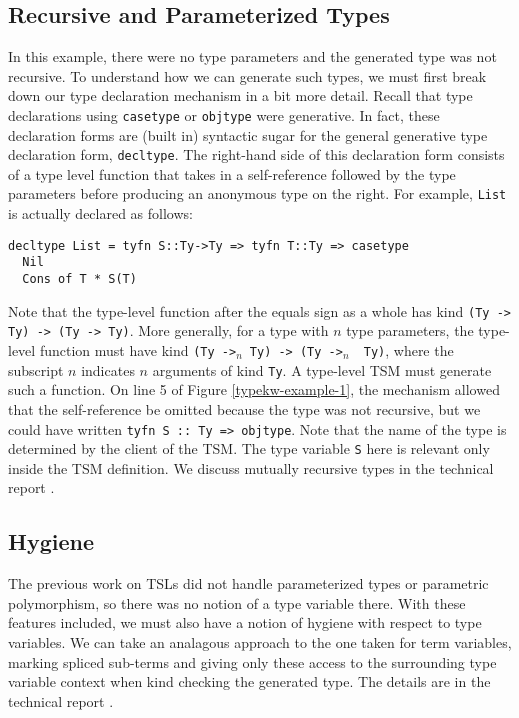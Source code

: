 \documentclass{sig-alternate}[10pt]
\newcommand{\lstinlinew}[1]{\lstinline[style=wyvern]{#1}}
\begin{document}
\subsection{Recursive and Parameterized Types}
In this example, there were no type parameters and the generated type was not recursive. To understand how we can generate such types, we must first break down our type declaration mechanism in a bit more detail. Recall that type declarations using \lstinlinew{casetype} or \lstinlinew{objtype} were generative. In fact, these declaration forms are (built in) syntactic sugar for the general generative type declaration form, \lstinlinew{decltype}. The right-hand side of this declaration form consists of a type level function that takes in a self-reference followed by the type parameters before producing an anonymous type on the right. For example, \lstinlinew{List} is actually declared as follows:

\begin{lstlisting}[style=wyvern, numbers=none,xleftmargin=0px,framexleftmargin=0px, frame=none]
decltype List = tyfn S::Ty->Ty => tyfn T::Ty => casetype 
  Nil
  Cons of T * S(T)
\end{lstlisting}
Note that the type-level function after the equals sign as a whole has kind \lstinlinew{(Ty -> Ty) -> (Ty -> Ty)}. More generally, for a type with $n$ type parameters, the type-level function must have kind \lstinlinew{(Ty ->}$_n$~\lstinlinew{Ty) -> (Ty ->}$_n$~\lstinlinew{ Ty)}, where the subscript $n$ indicates $n$ arguments of kind \lstinlinew{Ty}. A type-level TSM must generate such a function. On line 5 of Figure \ref{typekw-example-1}, the mechanism allowed that the self-reference be omitted because the type was not recursive, but we could have written \lstinlinew{tyfn S :: Ty => objtype}. Note that the name of the type is determined by the client of the TSM. The type variable \lstinlinew{S} here is relevant only inside the TSM definition. We discuss mutually recursive types in the  technical report \cite{sac15tr}.

\subsection{Hygiene}
The previous work on TSLs did not handle parameterized types or parametric polymorphism, so there was no notion of a type variable there. With these features included, we must also have a notion of hygiene with respect to type variables. We can take an analagous approach to the one taken for term variables, marking spliced sub-terms and giving only these access to the surrounding type variable context when kind checking the generated type. The details are in the technical report \cite{sac15tr}.
\end{document}
